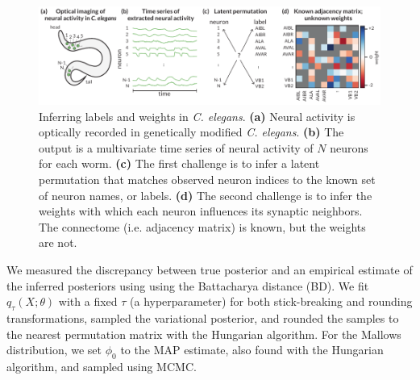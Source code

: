 \documentclass[twoside]{article}
\begin{document}
\begin{figure}[ht]
  \centering
  \includegraphics[width=6.25in]{celegans.pdf} 
  \caption{Inferring labels and weights in \textit{C. elegans}.
    \textbf{(a)} Neural activity is optically recorded in genetically
    modified \textit{C. elegans}. 
    \textbf{(b)} The output is a multivariate time series of
    neural activity of $N$ neurons for each worm.
    \textbf{(c)} The first challenge is to infer a latent permutation
    that matches observed neuron indices to the known set of neuron
    names, or labels.
    \textbf{(d)} The second challenge is to infer the weights with
    which each neuron influences its synaptic neighbors.  The connectome
    (i.e. adjacency matrix) is known, but the weights are not. }
  \vspace{-1em}
  \label{fig:connectome}
\end{figure}

We measured the discrepancy between true posterior and an empirical
estimate of the inferred posteriors using using the Battacharya
distance (BD). We fit $q_\tau(X; \theta)$ with a fixed $\tau$ (a hyperparameter) %
for both stick-breaking and rounding transformations, sampled the
variational posterior, and rounded the samples to the nearest
permutation matrix with the Hungarian algorithm. For the Mallows
distribution, we set $\phi_0$ to the MAP estimate, also found with the
Hungarian algorithm, and sampled using MCMC.
 
\end{document}
